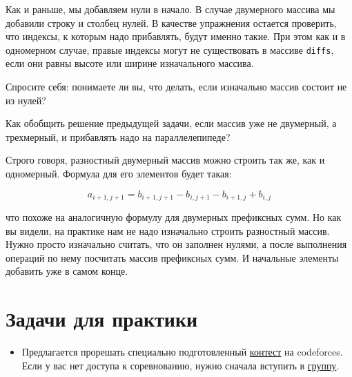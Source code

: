
\begin{observation}
    Как и раньше, мы добавляем нули в начало. В случае двумерного массива мы добавили строку и столбец нулей. В качестве упражнения остается проверить, что индексы, к которым надо прибавлять, будут именно такие. При этом как и в одномерном случае, правые индексы могут не существовать в массиве \verb+diffs+, если они равны высоте или ширине изначального массива.
\end{observation}

\begin{exercise}
    Спросите себя: понимаете ли вы, что делать, если изначально массив состоит не из нулей?
\end{exercise}

\begin{exercise}
    Как обобщить решение предыдущей задачи, если массив уже не двумерный, а трехмерный, и прибавлять надо на параллелепипеде?
\end{exercise}

\begin{definition}
    Строго говоря, разностный двумерный массив можно строить так же, как и одномерный. Формула для его элементов будет такая:

    $$a_{i + 1, j + 1} = b_{i + 1, j + 1} - b_{i, j + 1} - b_{i + 1, j} + b_{i, j}$$

    что похоже на аналогичную формулу для двумерных префиксных сумм. Но как вы видели, на практике нам не надо изначально строить разностный массив. Нужно просто изначально считать, что он заполнен нулями, а после выполнения операций по нему посчитать массив префиксных сумм. И начальные элементы добавить уже в самом конце.
\end{definition}


\section{Задачи для практики}

\begin{itemize}
    \item Предлагается прорешать специально подготовленный \href{https://codeforces.com/group/1rv4rhCsHp/contest/319055}{контест} на codeforces. Если у вас нет доступа к соревнованию, нужно сначала вступить в \href{https://codeforces.com/group/1rv4rhCsHp/contests}{группу}.
\end{itemize}
